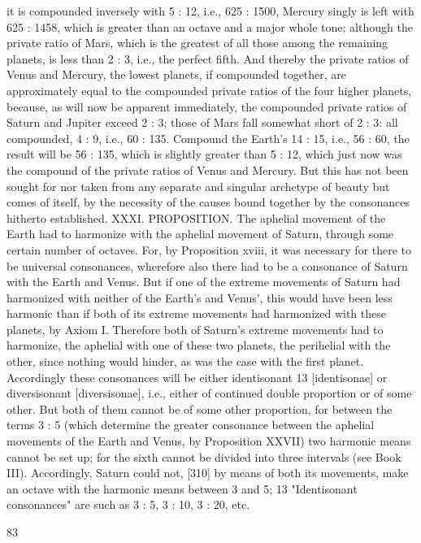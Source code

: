 \documentclass{article}
\begin{document}
it is compounded inversely with 5 : 12, i.e., 625 : 1500, Mercury singly is
left with 625 : 1458, which is greater than an octave and a major whole
tone; although the private ratio of Mars, which is the greatest of all those
among the remaining planets, is less than 2 : 3, i.e., the perfect fifth.
And thereby the private ratios of Venus and Mercury, the lowest planets,
if compounded together, are approximately equal to the compounded
private ratios of the four higher planets, because, as will now be apparent
immediately, the compounded private ratios of Saturn and Jupiter
exceed 2 : 3; those of Mars fall somewhat short of 2 : 3: all compounded,
4 : 9, i.e., 60 : 135. Compound the Earth's 14 : 15, i.e., 56 : 60, the result
will be 56 : 135, which is slightly greater than 5 : 12, which just now was
the compound of the private ratios of Venus and Mercury. But this has
not been sought for nor taken from any separate and singular archetype
of beauty but comes of itself, by the necessity of the causes bound
together by the consonances hitherto established.
XXXI. PROPOSITION. The aphelial movement of the Earth had to
harmonize with the aphelial movement of Saturn, through some certain
number of octaves.
For, by Proposition xviii, it was necessary for there to be universal
consonances, wherefore also there had to be a consonance of Saturn with
the Earth and Venus. But if one of the extreme movements of Saturn had
harmonized with neither of the Earth's and Venus’, this would have been
less harmonic than if both of its extreme movements had harmonized
with these planets, by Axiom I. Therefore both of Saturn's extreme
movements had to harmonize, the aphelial with one of these two planets,
the perihelial with the other, since nothing would hinder, as was the case
with the first planet. Accordingly these consonances will be either
identisonant 13 [identisonae] or diversisonant [diversisonae], i.e., either
of continued double proportion or of some other. But both of them
cannot be of some other proportion, for between the terms 3 : 5 (which
determine the greater consonance between the aphelial movements of
the Earth and Venus, by Proposition XXVII) two harmonic means
cannot be set up; for the sixth cannot be divided into three intervals (see
Book III). Accordingly, Saturn could not, [310] by means of both its
movements, make an octave with the harmonic means between 3 and 5;
13 "Identisonant consonances" are such as 3 : 5, 3 : 10, 3 : 20, etc.


83
\end{document}
